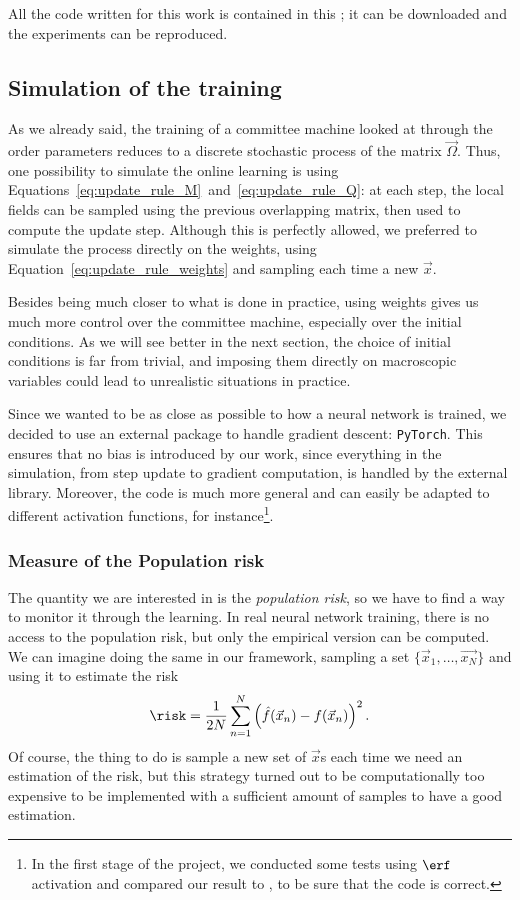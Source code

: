 All the code written for this work is contained in this ;
it can be downloaded and the experiments can be reproduced.


\subsection{Simulation of the training}
As we already said, the training of a committee machine looked at through the order parameters
reduces to a discrete stochastic process of the matrix \(\vec{\Omega}\). Thus, one possibility
to simulate the online learning is using Equations~\eqref{eq:update_rule_M}~and~\eqref{eq:update_rule_Q}:
at each step, the local fields can be sampled using the previous overlapping matrix, then
used to compute the update step. Although this is perfectly allowed, we preferred
to simulate the process directly on the weights, using Equation~\eqref{eq:update_rule_weights}
and sampling each time a new \(\vec{x}\).

Besides being much closer to what is done in practice, using weights gives us much more control over
the committee machine, especially over the initial conditions. 
As we will see better in the next section, the choice of initial conditions is far from trivial,
and imposing them directly on macroscopic variables could lead to unrealistic situations in practice.

Since we wanted to be as close as possible to how a neural network is trained,
we decided to use an external package to handle gradient descent: \texttt{PyTorch}\cite{pytorch2019}.
This ensures that no bias is introduced by our work, since everything in the simulation,
from step update to gradient computation, is handled by the external library.
Moreover, the code is much more general and can easily be adapted to different activation
functions, for instance\footnote{
    In the first stage of the project, we conducted some tests using \(\erf\) activation and compared
    our result to \cite{veiga2022phase}, to be sure that the code is correct.
}.

\subsubsection{Measure of the Population risk}
The quantity we are interested in is the \emph{population risk}, so we have to find
a way to monitor it through the learning. In real neural network training, there is 
no access to the population risk, but only the empirical version can be computed.
We can imagine doing the same in our framework, sampling a set \(\{\vec{x}_1,\dots,\vec{x_N}\}\) 
and using it to estimate the risk
\[\risk = \frac{1}{2N}\sum_{n=1}^N\left(\hat{f}(\vec{x}_n)-f(\vec{x}_n)\right)^2.\]
Of course, the thing to do is sample a new set of \(\vec{x}\)s each time we need an estimation
of the risk, but this strategy turned out to be computationally too expensive to be
implemented with a sufficient amount of samples to have a good estimation.

